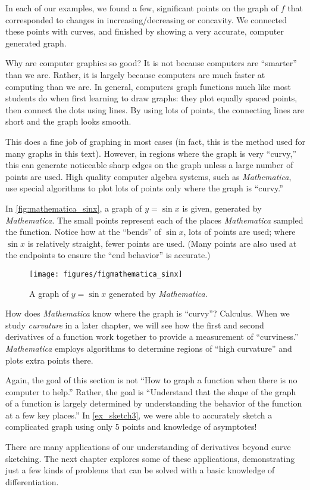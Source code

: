 In each of our examples, we found a few, significant points on the graph of $f$ that corresponded to changes in increasing/decreasing or concavity. We connected these points with curves, and finished by showing a very accurate, computer generated graph. 

Why are computer graphics so good? It is not because computers are ``smart\-er'' than we are. Rather, it is largely because computers are much faster at computing than we are. In general, computers graph functions much like most students do when first learning to draw graphs: they plot equally spaced points, then connect the dots using lines. By using lots of points, the connecting lines are short and the graph looks smooth. 

This does a fine job of graphing in most cases (in fact, this is the method used for many graphs in this text). However, in regions where the graph is very ``curvy,'' this can generate noticeable sharp edges on the graph unless a large number of points are used. High quality computer algebra systems, such as \textit{Mathematica}, use special algorithms to plot lots of points only where the graph is ``curvy.''

In \autoref{fig:mathematica_sinx}, a graph of $y=\sin x$ is given, generated by \textit{Mathematica}. The small points represent each of the places \textit{Mathematica} sampled the function. Notice how at the ``bends'' of $\sin x$, lots of points are used; where $\sin x$ is relatively straight, fewer points are used. (Many points are also used at the endpoints to ensure the ``end behavior'' is accurate.) 

\begin{figure}[!ht]
\centering
\texttt{[image: figures/figmathematica\_sinx]}
\caption{A graph of $y=\sin x$ generated by \textit{Mathematica}.}
\label{fig:mathematica_sinx}
\end{figure}

How does \textit{Mathematica} know where the graph is ``curvy''? Calculus. When we study \textit{curvature} in a later chapter, we will see how the first and second derivatives of a function work together to provide a measurement of ``curviness.'' \textit{Mathematica} employs algorithms to determine regions of ``high curvature'' and plots extra points there.

Again, the goal of this section is not ``How to graph a function when there is no computer to help.'' Rather, the goal is ``Understand that the shape of the graph of a function is largely determined by understanding the behavior of the function at a few key places.'' In \autoref{ex_sketch3}, we were able to accurately sketch a complicated graph using only 5 points and knowledge of asymptotes!

There are many applications of our understanding of derivatives beyond curve sketching. The next chapter explores some of these applications, demonstrating just a few kinds of problems that can be solved with a basic knowledge of differentiation. 


